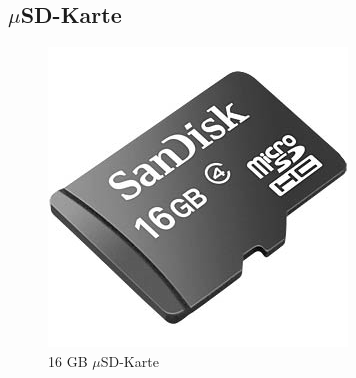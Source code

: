 \subsection{$\mu$SD-Karte}
\begin{figure}[h]
\centering
\includegraphics[width=0.2\linewidth]{graphics/Datenspeicherung/micro_sd_card_16GB.png}
\caption{16 GB $\mu$SD-Karte}
\label{fig:muSDKarte}
\end{figure}
